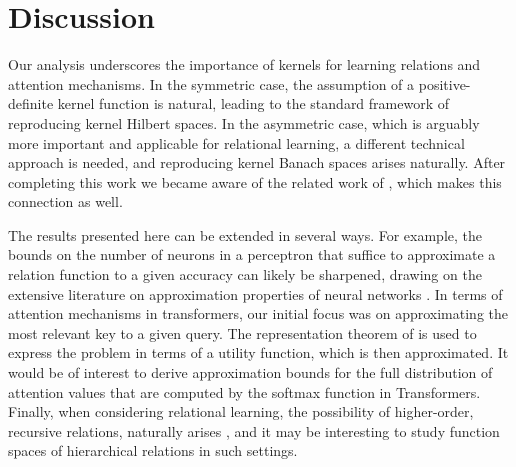 \section{Discussion}

Our analysis underscores the importance of kernels for learning relations and attention mechanisms. In the symmetric case, the assumption of a positive-definite kernel function is natural, leading to the standard framework of reproducing kernel Hilbert spaces. In the asymmetric case, which is arguably more important and applicable for relational learning, a different technical approach is needed, and reproducing kernel Banach spaces arises naturally. After completing this work we became aware of the related work of \citet{wright2021transformers}, which makes this connection as well.

The results presented here can be extended in several ways. For example, the bounds on the number of neurons in a perceptron that suffice to approximate a relation function to a given accuracy can likely be sharpened, drawing on the extensive literature on approximation properties of neural networks \citep[e.g.,][]{petrushev1998approximation,pinkus1999approximation,makovoz1998uniform,burger2001error,maiorov2006approximation,bachBreakingCurseDimensionality2016}. In terms of attention mechanisms in transformers, our initial focus was on approximating the most relevant key to a given query. The representation theorem of \citet{debreuRepresentationPreferenceOrdering1954} is used to express the problem in terms of a utility function, which is then approximated. It would be of interest to derive approximation bounds for the full distribution of attention values that are computed by the softmax function in Transformers. Finally, when considering relational learning, the possibility of higher-order, recursive relations, naturally arises \citep[e.g.,][]{altabaaRelationalConvolutionalNetworks2023}, and it may be interesting to study function spaces of hierarchical relations in such settings.
